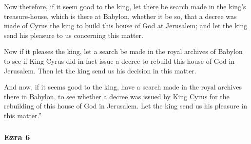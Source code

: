 			\begin{versebox}
					\item[BHS] 
					\item[LXX] 
					\item[ASV] Now therefore, if it seem good to the king, let there be search made in the king's treasure-house, which is there at Babylon, whether it be so, that a decree was made of Cyrus the king to build this house of God at Jerusalem; and let the king send his pleasure to us concerning this matter.
					\item[NIV] Now if it pleases the king, let a search be made in the royal archives of Babylon to see if King Cyrus did in fact issue a decree to rebuild this house of God in Jerusalem. Then let the king send us his decision in this matter.
					\item[NRSV] And now, if it seems good to the king, have a search made in the royal archives there in Babylon, to see whether a decree was issued by King Cyrus for the rebuilding of this house of God in Jerusalem. Let the king send us his pleasure in this matter.”
			\end{versebox}
	\subsubsection{Ezra 6} %
		\label{EZRA-6}

